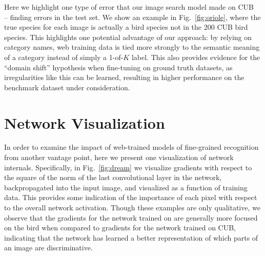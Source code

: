 \documentclass[runningheads]{llncs}
\begin{document}
Here we highlight one type of error that our image search model made on CUB~\cite{wah2011multiclass} -- finding errors in the test set.
We show an example in Fig.~\ref{fig:oriole}, where the true species for each image is actually a bird species not in the 200 CUB bird species.
This highlights one potential advantage of our approach: by relying on category names, web training data is tied more strongly to the semantic meaning of a category instead of simply a 1-of-$K$ label.
This also provides evidence for the ``domain shift'' hypothesis when fine-tuning on ground truth datasets, as irregularities like this can be learned, resulting in higher performance on the benchmark dataset under consideration.


\section{Network Visualization}

In order to examine the impact of web-trained models of fine-grained recognition from another vantage point, here we present one visualization of network internals.
Specifically, in Fig.~\ref{fig:dream} we visualize gradients with respect to the square of the norm of the last convolutional layer in the network, backpropagated into the input image, and visualized as a function of training data.
This provides some indication of the importance of each pixel with respect to the overall network activation.
Though these examples are only qualitative, we observe that the gradients for the network trained on \lbird{} are generally more focused on the bird when compared to gradients for the network trained on CUB, indicating that the network has learned a better representation of which parts of an image are discriminative.
\end{document}
